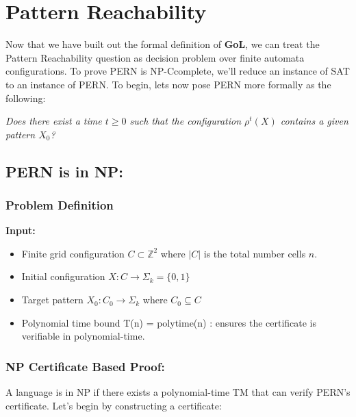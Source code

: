 \documentclass{article}
\theoremstyle{definition}
\theoremstyle{plain}
\theoremstyle{plain}
\begin{document}
\section{Pattern Reachability}
Now that we have built out the formal definition of \textbf{GoL}, we can treat the Pattern Reachability question as decision problem over finite automata configurations. To prove PERN is NP-Ccomplete, we’ll reduce an instance of SAT to an instance of PERN. To begin, lets now pose PERN more formally as the following:

\textit{Does there exist a time $t \geq 0$ such that the configuration $\rho^t(X)$ contains a given pattern $X_0$?}

\subsection{PERN is in NP:}


\subsubsection*{Problem Definition}
\textbf{Input:}
\begin{itemize}
    \item Finite grid configuration $ C \subset \mathbb{Z}^2 $ where $ |C| $ is the total number cells $n$.
  \item Initial configuration $ X: C \to \Sigma_k = \{0,1\}$ 
    \item Target pattern $ X_0: C_0 \to \Sigma_k $ where \( C_0 \subseteq C \)
    \item Polynomial time bound T(n) = polytime(n) : ensures the certificate is verifiable in polynomial-time.
\end{itemize}

\subsubsection{NP Certificate Based Proof:\cite{SUTNER199587}}
A language is in NP if there exists a polynomial-time TM that can verify PERN's certificate. Let's begin by constructing a certificate:
\end{document}
